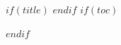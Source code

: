 $if(title)$
\frame{\titlepage}
$endif$
$if(toc)$
\begin{frame}
\tableofcontents[hideallsubsections]
\end{frame}
$endif$
